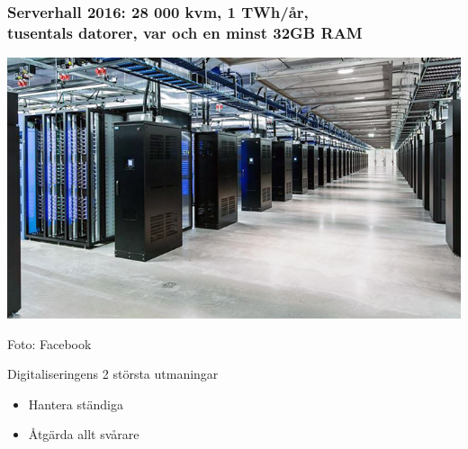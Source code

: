 \documentclass{lecturesimple}
\begin{document}
  \begin{frame}\frametitle{Serverhall 2016: 28 000 kvm, 1 TWh/år, \\tusentals datorer, var och en minst 32GB RAM}
    \begin{center}
      \includegraphics[width=1.05\textwidth]{../img/lulea-datacenter.jpg}
    
      {\fontsize{5}{5}\selectfont\color{gray}
    Foto: Facebook
    }
    \end{center}
  \end{frame}
  


\begin{Slide}{Digitaliseringens 2 största utmaningar}
  \begin{itemize}\Large
    \item Hantera ständiga 
    \item Åtgärda allt svårare  
  \end{itemize}  
\end{Slide}

\end{document}

